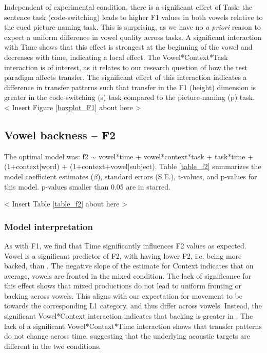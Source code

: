\documentclass[12 pt]{article}
\newcommand{\nt}[1]{\textipa{[#1]}} %
\begin{document}
Independent of experimental condition, there is a significant effect of Task: the sentence task (code-switching) leads to higher F1 values in both vowels relative to the cued picture-naming task. This is surprising, as we have no \textit{a priori} reason to expect a uniform difference in vowel quality across tasks. A significant interaction with Time shows that this effect is strongest at the beginning of the vowel and decreases with time, indicating a local effect. The Vowel*Context*Task interaction is of interest, as it relates to our research question of how the test paradigm affects transfer. The significant effect of this interaction indicates a difference in transfer patterns such that transfer in the F1 (height) dimension is greater in the code-switching (s) task compared to the picture-naming (p) task.\\


< Insert Figure \ref{boxplot_F1} about here >\\



\subsection{Vowel backness -- F2}
The optimal model was: f2 $\sim$ vowel*time + vowel*context*task + task*time + (1+context|word) + (1+context+vowel|subject). Table \ref{table_f2} summarizes the model coefficient estimates ($\beta$), standard errors (S.E.), t-values, and p-values for this model. p-values smaller than 0.05 are in starred.

< Insert Table \ref{table_f2} about here >\\

\subsubsection*{Model interpretation}

As with F1, we find that Time significantly influences F2 values as expected. Vowel is a significant predictor of F2, with \nt{2} having lower F2, i.e. being more backed, than \nt{\ae}. The negative slope of the estimate for Context indicates that on average, vowels are fronted in the mixed condition. The lack of significance for this effect shows that mixed productions do not lead to uniform fronting or backing across vowels. This aligns with our expectation for movement to be towards the corresponding L1 category, and thus differ across vowels. Instead, the significant Vowel*Context interaction indicates that backing is greater in \nt{\ae}. The lack of a significant Vowel*Context*Time interaction shows that transfer patterns do not change across time, suggesting that the underlying acoustic targets are different in the two conditions.
 
\end{document}
